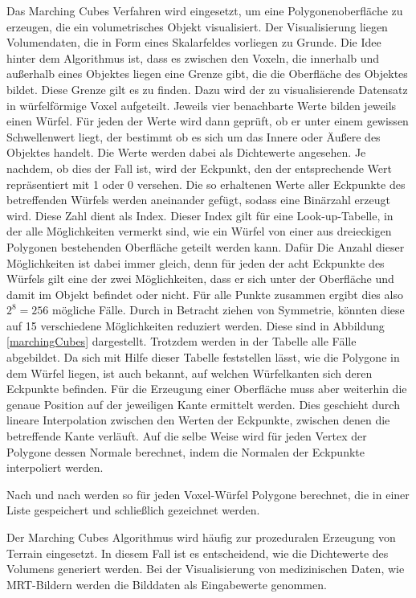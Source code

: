 Das Marching Cubes Verfahren wird eingesetzt, um eine Polygonenoberfläche zu erzeugen, die ein volumetrisches Objekt visualisiert. 
Der Visualisierung liegen Volumendaten, die in Form eines Skalarfeldes vorliegen zu Grunde.
Die Idee hinter dem Algorithmus ist, dass es zwischen den Voxeln, die innerhalb und außerhalb eines Objektes liegen eine Grenze gibt, die die Oberfläche des Objektes bildet. Diese Grenze gilt es zu finden. Dazu wird der zu visualisierende Datensatz in würfelförmige Voxel aufgeteilt. Jeweils vier benachbarte Werte bilden jeweils einen Würfel. Für jeden der Werte wird dann geprüft, ob er unter einem gewissen Schwellenwert liegt, der bestimmt ob es sich um das Innere oder Äußere des Objektes handelt. Die Werte werden dabei als Dichtewerte angesehen. Je nachdem, ob dies der Fall ist, wird der Eckpunkt, den der entsprechende Wert repräsentiert mit 1 oder 0 versehen. Die so erhaltenen Werte aller Eckpunkte des betreffenden Würfels werden aneinander gefügt, sodass eine Binärzahl erzeugt wird. Diese Zahl dient als Index. 
Dieser Index gilt für eine Look-up-Tabelle, in der alle Möglichkeiten vermerkt sind, wie ein Würfel von einer aus dreieckigen Polygonen bestehenden Oberfläche geteilt werden kann. Dafür  Die Anzahl dieser Möglichkeiten ist dabei immer gleich, denn für jeden der acht Eckpunkte des Würfels gilt eine der zwei Möglichkeiten, dass er sich unter der Oberfläche und damit im Objekt befindet oder nicht. Für alle Punkte zusammen ergibt dies also $2^8=256$ mögliche Fälle. Durch in Betracht ziehen von Symmetrie, könnten diese auf 15 verschiedene Möglichkeiten reduziert werden. Diese sind in Abbildung \ref{marchingCubes} dargestellt. Trotzdem werden in der Tabelle alle Fälle abgebildet. 
Da sich mit Hilfe dieser Tabelle feststellen lässt, wie die Polygone in dem Würfel liegen, ist auch bekannt, auf welchen Würfelkanten sich deren Eckpunkte befinden. Für die Erzeugung einer Oberfläche muss aber weiterhin die genaue Position auf der jeweiligen Kante ermittelt werden. Dies geschieht durch lineare Interpolation zwischen den Werten der Eckpunkte, zwischen denen die betreffende Kante verläuft.
Auf die selbe Weise wird für jeden Vertex der Polygone dessen Normale berechnet, indem die Normalen der Eckpunkte interpoliert werden.

Nach und nach werden so für jeden Voxel-Würfel Polygone berechnet, die in einer Liste gespeichert und schließlich gezeichnet werden.


Der Marching Cubes Algorithmus wird häufig zur prozeduralen Erzeugung von Terrain eingesetzt. In diesem Fall ist es entscheidend, wie die Dichtewerte des Volumens generiert werden. Bei der Visualisierung von medizinischen Daten, wie MRT-Bildern werden die Bilddaten als Eingabewerte genommen.

